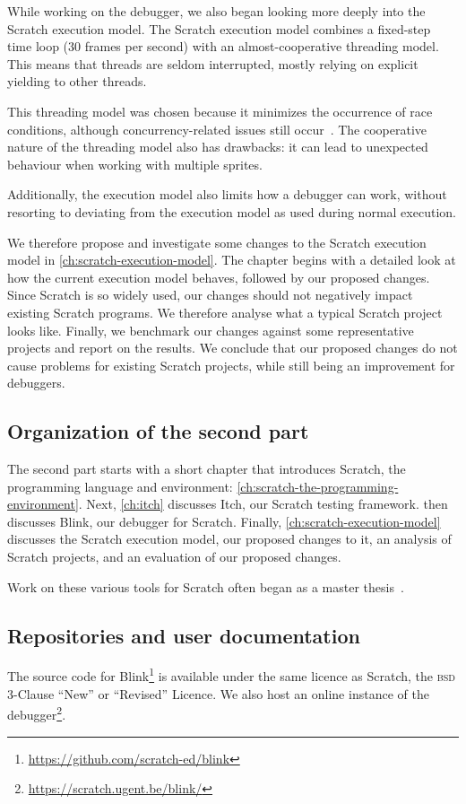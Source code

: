 \documentclass[../main]{subfiles}
\begin{document}
While working on the debugger, we also began looking more deeply into the Scratch execution model.
The Scratch execution model combines a fixed-step time loop (30 frames per second) with an almost-cooperative threading model.
This means that threads are seldom interrupted, mostly relying on explicit yielding to other threads.

This threading model was chosen because it minimizes the occurrence of race conditions, although concurrency-related issues still occur~\autocite{maloneyScratchProgrammingLanguage2010}.
The cooperative nature of the threading model also has drawbacks: it can lead to unexpected behaviour when working with multiple sprites.

Additionally, the execution model also limits how a debugger can work, without resorting to deviating from the execution model as used during normal execution.

We therefore propose and investigate some changes to the Scratch execution model in \cref{ch:scratch-execution-model}.
The chapter begins with a detailed look at how the current execution model behaves, followed by our proposed changes.
Since Scratch is so widely used, our changes should not negatively impact existing Scratch programs.
We therefore analyse what a typical Scratch project looks like.
Finally, we benchmark our changes against some representative projects and report on the results.
We conclude that our proposed changes do not cause problems for existing Scratch projects, while still being an improvement for debuggers.

\subsection{Organization of the second part}\label{subsec:organization-of-the-second-part}

The second part starts with a short chapter that introduces Scratch, the programming language and environment: \cref{ch:scratch-the-programming-environment}.
Next, \cref{ch:itch} discusses Itch, our Scratch testing framework.
 then discusses Blink, our debugger for Scratch.
Finally, \cref{ch:scratch-execution-model} discusses the Scratch execution model, our proposed changes to it, an analysis of Scratch projects, and an evaluation of our proposed changes.

Work on these various tools for Scratch often began as a master thesis~\autocite{makItchEenEducatief2019,voetenEenBlokgebaseerdTestframework2023,goethalsEenTimeTravelling2023,deproftBlinkEenEducatieve2022}.

\subsection{Repositories and user documentation}\label{subsec:repositories-and-code-scratch}

The source code for Blink\footnote{\url{https://github.com/scratch-ed/blink}} is available under the same licence as Scratch, the \textsc{bsd} 3-Clause ``New'' or ``Revised'' Licence.
We also host an online instance of the debugger\footnote{\url{https://scratch.ugent.be/blink/}}.
\end{document}
